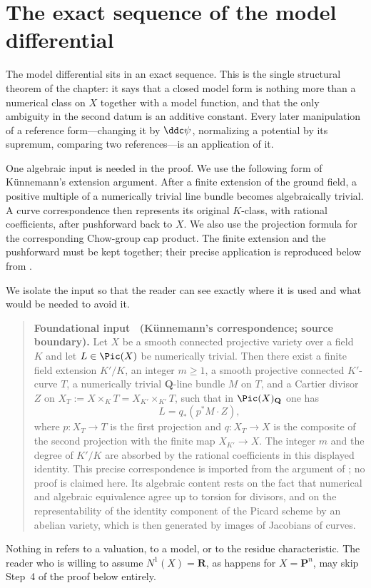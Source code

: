 \section{The exact sequence of the model differential}
\label{sec:ch20-exact}

The model differential sits in an exact sequence.  This is the single
structural theorem of the chapter: it says that a closed model form is
nothing more than a numerical class on $X$ together with a model function,
and that the only ambiguity in the second datum is an additive constant.
Every later manipulation of a reference form---changing it by $\ddc\psi$,
normalizing a potential by its supremum, comparing two references---is an
application of it.

One algebraic input is needed in the proof.  We use the following form of
K\"unnemann's extension argument.  After a finite extension of the ground
field, a positive multiple of a numerically trivial line bundle becomes
algebraically trivial.  A curve correspondence then represents its original
$K$-class, with rational coefficients, after pushforward back to $X$.
We also use the projection formula for the corresponding Chow-group cap
product.  The finite extension and the pushforward must be kept together;
their precise application is reproduced below from
\cite[proof of Theorem~4.3]{BFJ16}.

We isolate the input so that the reader can see exactly where it is used and
what would be needed to avoid it.

\label{lem:ch20-kunnemann-input}
\begin{quote}
\textbf{Foundational input \thelemma\ (K\"unnemann's correspondence;
source boundary).}
Let $X$ be a smooth connected projective variety over a field $K$ and
let $L\in\Pic(X)$ be numerically trivial.  Then there exist a finite field
extension $K'/K$, an integer $m\geq1$, a smooth projective connected
$K'$-curve $T$, a numerically trivial $\mathbf Q$-line bundle $M$ on
$T$, and a Cartier divisor $Z$ on
$X_T:=X\times_KT=X_{K'}\times_{K'}T$, such that in
$\Pic(X)_{\mathbf Q}$ one has
\[
                 L=q_*(p^*M\cdot Z),
\]
where $p:X_T\to T$ is the first projection and
$q:X_T\to X$ is the composite of the second projection with the finite
map $X_{K'}\to X$.  The integer $m$ and the degree of $K'/K$ are
absorbed by the rational coefficients in this displayed identity.
This precise correspondence is imported from the argument of
\cite[proof of Theorem~4.3]{BFJ16}; no proof is claimed here.  Its
algebraic content rests on the fact that numerical and
algebraic equivalence agree up to torsion for divisors, and on the
representability of the identity component of the Picard scheme by an
abelian variety, which is then generated by images of Jacobians of curves.
\end{quote}
Nothing in  refers to a valuation, to a
model, or to the residue characteristic.  The reader who is willing to
assume $N^1(X)=\mathbf R$, as happens for $X=\mathbf P^n$, may skip
Step~4 of the proof below entirely.

